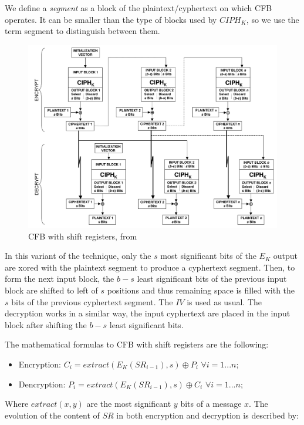 \documentclass[11pt]{article}
\newcommand\CIPH{C\!I\!P\!H_K}
\begin{document}
We define a {\em segment} as a block of the plaintext/cyphertext on which CFB operates. It can be smaller than the type of blocks used by $\CIPH$, so we use the term segment to distinguish between them.

\begin{figure}[!ht]
  \centering
  \includegraphics[width=1\textwidth]{pic3-hw1-1692419}
  \caption{CFB with shift registers, from \cite{nist}}
  \label{fig:cfb_shift}
\end{figure}

In this variant of the technique, only the $s$ most significant bits of the $E_K$ output are xored with the plaintext segment to produce a cyphertext segment. Then, to form the next input block, the $b - s$ least significant bits of the previous input block are shifted to left of $s$ positions and thus remaining space is filled with the $s$ bits of the previous cyphertext segment. The $IV$ is used as usual.
The decryption works in a similar way, the input cyphertext are placed in the input block after shifting the $b - s$ least significant bits.

The mathematical formulas to CFB with shift registers are the following:

\begin{itemize}
\item Encryption: $C_i = extract(E_K(SR_{i-1}), s) \oplus P_i$ $\forall i = 1...n$;
\item Dencryption: $P_i = extract(E_K(SR_{i-1}), s) \oplus C_i$ $\forall i = 1...n$;
\end{itemize}

Where $extract(x, y)$ are the most significant $y$ bits of a message $x$. The evolution of the content of $SR$ in both encryption and decryption is described by:
\end{document}
